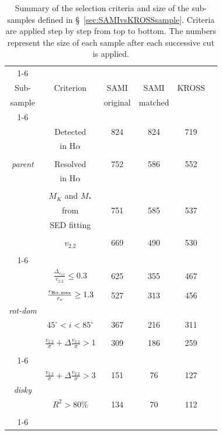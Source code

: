 \documentclass[a4paper,fleqn,usenatbib]{mnras}
\begin{document}
{\begin{table}
\begin{tabular}{ c|c|cccc}
\cline{1-6}
&&&&\\
Sub- & Criterion & SAMI & SAMI & KROSS  \\
sample &  & original & matched &  \\
\cline{1-6}
&&&&\\
& Detected & 824 & 824 & 719 \\
& in H$\alpha$ & & & \\
&&&&\\
\textit{parent} & Resolved & 752 & 586 & 552 \\
& in H$\alpha$ & & & \\
&&&&\\
& $M_{K}$ and $M_{*}$ \\
& from & 751 & 585 & 537 \\
& SED fitting \\
&&&&\\
& $v_{2.2}$ & 669 & 490 & 530 \\
&&&&\\
\cline{1-6}
&&&&\\
& $\frac{\Delta_{v_{2.2}}}{v_{2.2}} \leq 0.3$ & 625 & 355 & 467 \\
&&&&\\
& $\frac{r_{\rm{H}\alpha,\rm{max}}}{r_{\text{e}}} \ge 1.3$ & 527 & 313 & 456 \\
\textit{rot-dom}  &&&&\\
& $45^\circ < i < 85^\circ$ & 367 & 216 & 311 \\
&&&&\\
& $\frac{v_{2.2}}{\sigma} + \Delta\frac{v_{2.2}}{\sigma} > 1$ & 309 & 186 & 259 \\
&&&&\\
\cline{1-6}
&&&&\\
& $\frac{v_{2.2}}{\sigma} + \Delta\frac{v_{2.2}}{\sigma} > 3$ & 151 & 76 & 127 \\
\textit{disky} &&&&\\
& $R^{2} > 80$\% & 134 & 70 & 112 \\

&&&&\\
\cline{1-6}
\end{tabular}
\caption{Summary of the selection criteria and size of the sub-samples defined in \S~\ref{sec:SAMIvsKROSSsample}. Criteria are applied step by step from top to bottom. The numbers represent the size of each sample after each successive cut is applied.}
\label{tab:SAMIKROSSsamples}
\end{table}

}
\end{document}
